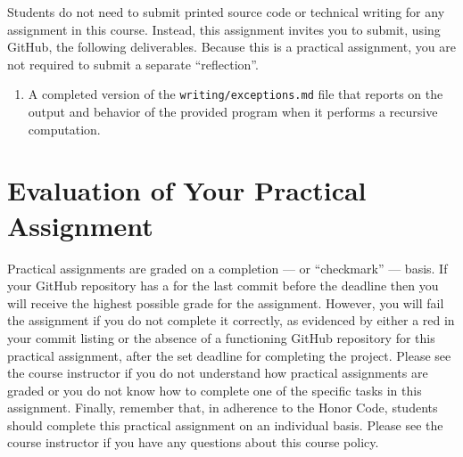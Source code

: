 \documentclass[11pt]{article}
\newcommand{\program}[1]{\lstinline{#1}}
\newcommand{\checkmark}{\ding{51}}
\newcommand{\naughtmark}{\ding{55}}
\begin{document}
Students do not need to submit printed source code or technical writing for any assignment in this course.
Instead, this assignment invites you to submit, using GitHub, the following deliverables. Because this is a practical
assignment, you are not required to submit a separate ``reflection''.

\begin{enumerate}

\setlength{\itemsep}{0in}

\item A completed version of the \program{writing/exceptions.md} file that reports on the output and behavior of the
  provided program when it performs a recursive computation.

\end{enumerate}

\section*{Evaluation of Your Practical Assignment}

Practical assignments are graded on a completion --- or ``checkmark'' --- basis. If your GitHub repository has a
\checkmark{} for the last commit before the deadline then you will receive the highest possible grade for the
assignment. However, you will fail the assignment if you do not complete it correctly, as evidenced by either a red
\naughtmark{} in your commit listing or the absence of a functioning GitHub repository for this practical assignment,
after the set deadline for completing the project. Please see the course instructor if you do not understand how
practical assignments are graded or you do not know how to complete one of the specific tasks in this assignment.
Finally, remember that, in adherence to the Honor Code, students should complete this practical assignment on an
individual basis. Please see the course instructor if you have any questions about this course policy.
\end{document}
